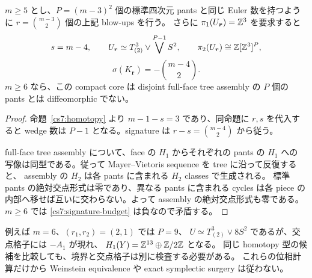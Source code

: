 \begin{corollary}
\label{cs7:canonical-budget}
$m\geq5$ とし、$P=(m-3)^2$ 個の標準四次元 pants と同じ Euler 数を持つように
$r=\binom{m-3}{2}$ 個の上記 blow-ups を行う。
さらに $\pi_1(U_{\boldsymbol r})=\mathbb Z^3$ を要求すると
\[
 s=m-4,\qquad
 U_{\boldsymbol r}\simeq T^3_{(2)}\vee\bigvee^{P-1}S^2,
 \qquad\pi_2(U_{\boldsymbol r})\cong\mathbb Z[\mathbb Z^3]^P,
\]
\begin{equation}\label{cs7:signature-budget}
 \sigma(K_{\boldsymbol r})=-\binom{m-4}{2}.
\end{equation}
$m\geq6$ なら、この compact core は disjoint full-face tree assembly の
$P$ 個の pants とは diffeomorphic でない。
\end{corollary}

\begin{proof}
命題~\ref{cs7:homotopy} より $m-1-s=3$ であり、同命題に $r,s$ を代入すると
wedge 数は $P-1$ となる。signature は
$r-s=\binom{m-4}{2}$ から従う。

full-face tree assembly について、face の $H_1$ からそれぞれの pants の $H_1$ への
写像は同型である。従って Mayer--Vietoris sequence を tree に沿って反復すると、
assembly の $H_2$ は各 pants に含まれる $H_2$ classes で生成される。
標準 pants の絶対交点形式は零であり、異なる pants に含まれる cycles は各 piece の
内部へ移せば互いに交わらない。よって assembly の絶対交点形式も零である。
$m\geq6$ では \eqref{cs7:signature-budget} は負なので矛盾する。
\end{proof}

例えば $m=6$、$(r_1,r_2)=(2,1)$ では $P=9$、
$U\simeq T^3_{(2)}\vee8S^2$ であるが、交点格子には $-A_1$ が現れ、
$H_1(Y)=\mathbb Z^{13}\oplus\mathbb Z/2\mathbb Z$ となる。
同じ homotopy 型の候補を比較しても、境界と交点格子は別に検査する必要がある。
これらの位相計算だけから Weinstein equivalence や exact symplectic surgery は従わない。
